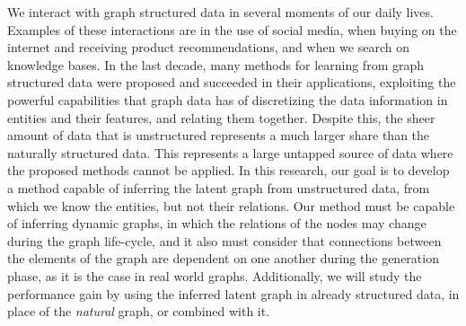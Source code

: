 We interact with graph structured data in several moments of our daily lives. Examples of these interactions are in the use of social media, when buying on the internet and receiving product recommendations, and when we search on knowledge bases.
%
In the last decade, many methods for learning from graph structured data were proposed and succeeded in their applications, exploiting the powerful capabilities that graph data has of discretizing the data information in entities and their features, and relating them together.
%
Despite this, the sheer amount of data that is unstructured represents a much larger share than the naturally structured data. This represents a large untapped source of data where the proposed methods cannot be applied.
%
In this research, our goal is to develop a method capable of inferring the latent graph from unstructured data, from which we know the entities, but not their relations.
%
Our method must be capable of inferring dynamic graphs, in which the relations of the nodes may change during the graph life-cycle, and it also must consider that  connections between the elements of the graph are dependent on one another during the generation phase, as it is the case in real world graphs.
%
Additionally, we will study the performance gain by using the inferred latent graph in already structured data, in place of the \emph{natural} graph, or combined with it.